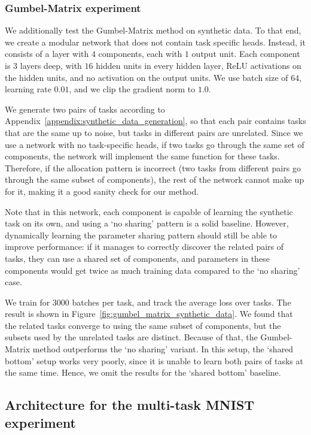 \documentclass[conference]{IEEEtran}
\begin{document}
\subsubsection{Gumbel-Matrix experiment}\label{appendix:synthetic_data_gumbel_matrix}

We additionally test the Gumbel-Matrix method on synthetic data. To that end, we create a modular network that does not contain task specific heads. Instead, it consists of a layer with $4$ components, each with $1$ output unit. Each component is $3$ layers deep, with $16$ hidden units in every hidden layer, ReLU activations on the hidden units, and no activation on the output units. We use batch size of $64$, learning rate $0.01$, and we clip the gradient norm to $1.0$.

We generate two pairs of tasks according to Appendix~\ref{appendix:synthetic_data_generation}, so that each pair contains tasks that are the same up to noise, but tasks in different pairs are unrelated. Since we use a network with no task-specific heads, if two tasks go through the same set of components, the network will implement the same function for these tasks. Therefore, if the allocation pattern is incorrect (two tasks from different pairs go through the same subset of components), the rest of the network cannot make up for it, making it a good sanity check for our method.

Note that in this network, each component is capable of learning the synthetic task on its own, and using a `no sharing' pattern is a solid baseline. However, dynamically learning the parameter sharing pattern should still be able to improve performance: if it manages to correctly discover the related pairs of tasks, they can use a shared set of components, and parameters in these components would get twice as much training data compared to the `no sharing' case.

We train for $3000$ batches per task, and track the average loss over tasks. The result is shown in Figure~\ref{fig:gumbel_matrix_synthetic_data}. We found that the related tasks converge to using the same subset of components, but the subsets used by the unrelated tasks are distinct. Because of that, the Gumbel-Matrix method outperforms the `no sharing' variant. In this setup, the `shared bottom' setup works very poorly, since it is unable to learn both pairs of tasks at the same time. Hence, we omit the results for the `shared bottom' baseline.

\subsection{Architecture for the multi-task MNIST experiment}\label{appendix:mnist_mt_network}
\end{document}
